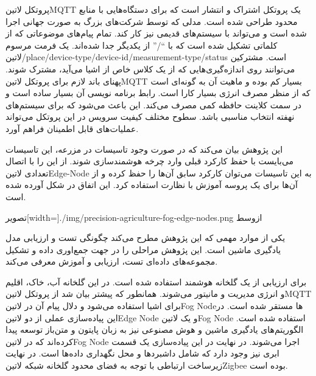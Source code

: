  پروتکل ‌لاتین{MQTT} یک پروتکل اشتراک و انتشار است که برای دستگاه‌هایی با منابع محدود طراحی شده است. مدلی که توسط شرکت‌های بزرگ به صورت جهانی اجرا شده است
و می‌تواند با سیستم‌های قدیمی نیز کار کند.
 تمام پیام‌های موضوعاتی که از کلماتی تشکیل شده است که با ``/'' از یکدیگر جدا شده‌اند. یک فرمت مرسوم ‌لاتین{/place/device-type/device-id/measurement-type/status}
است. مشترکین می‌توانند روی اندازه‌گیری‌هایی که از یک کلاس خاص از اشیا می‌آید، مشترک شوند.
 پهنای باند لازم برای پروتکل ‌لاتین{MQTT} بسیار کم بوده و ماهیت آن به گونه‌ای است که از منظر مصرف انرژی بسیار کارا است.
 رابط برنامه نویسی آن بسیار ساده است و در سمت کلاینت حافظه کمی مصرف می‌کند. این باعث می‌شود که برای سیستم‌های نهفته انتخاب مناسبی باشد.
 سطوح مختلف کیفیت سرویس در این پروتکل می‌تواند عملیات‌های قابل اطمینان فراهم آورد.

این پژوهش بیان می‌کند که در صورت وجود تاسیسات در مزرعه، این تاسیسات می‌بایست با حفظ کارکرد قبلی وارد چرخه هوشمند‌سازی شوند. از این را با اتصال تعدادی ‌لاتین{Edge-Node} به این تاسیسات می‌توان
کارکرد سابق آن‌ها را حفظ کرده و از آن‌ها برای یک پروسه آموزش با نظارت استفاده کرد. این اتفاق در شکل  آورده شده است.

‌تصویر[width=\textwidth]{./img/precision-agriculture-fog-edge-nodes.png}
‌ازوسط

یکی از موارد مهمی که این پژوهش مطرح می‌کند چگونگی تست و ارزیابی مدل یادگیری ماشین است. این پژوهش مراحلی را در جهت جمع‌اوری داده و تشکیل مجموعه‌های داده‌ای تست، ارزیابی و آموزش معرفی می‌کند.

برای ارزیابی از یک گلخانه هوشمند استفاده شده است. در این گلخانه آب، خاک، اقلیم و انرژی مدیریت و مانیتور می‌شوند. همانطور که پیشتر بیان شد از پروتکل ‌لاتین{MQTT} برای اشیا استفاده می‌شود و دلال پیام آن
در ‌لاتین{Fog Node}ها مستقر شده است. در این پیاده‌سازی عملی از دو ‌لاتین{Edge Node} و یک ‌لاتین{Fog Node} استفاده شده است. الگوریتم‌های یادگیری ماشین و هوش مصنوعی نیز به زبان پایتون و متن‌باز
توسعه پیدا کرده‌اند که در ‌لاتین{Fog Node} اجرا می‌شوند. در نهایت در این پیاده‌سازی یک قسمت ابری نیز وجود دارد که شامل داشبردها و محل نگهداری داده‌ها است. در نهایت زیرساخت ارتباطی با توجه به فضای محدود گلخانه شبکه
‌لاتین{Zigbee} بوده است.


